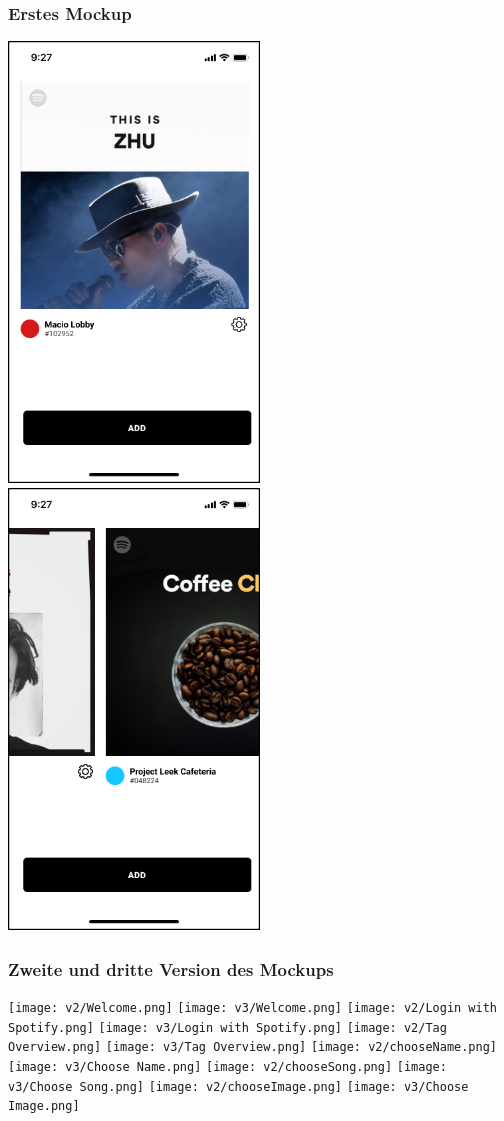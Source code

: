 \documentclass[10pt, a4paper]{article}
\begin{document}
  \subsubsection*{Erstes Mockup}
  \includegraphics[width=0.5\textwidth]{v1/Home.png}
  \includegraphics[width=0.5\textwidth]{v1/Carousel.png}
  \newpage
  \subsubsection*{Zweite und dritte Version des Mockups}
  \texttt{[image: v2/Welcome.png]}
  \texttt{[image: v3/Welcome.png]}
  \newpage
  \texttt{[image: v2/Login with Spotify.png]}
  \texttt{[image: v3/Login with Spotify.png]}
  \newpage
  \texttt{[image: v2/Tag Overview.png]}
  \texttt{[image: v3/Tag Overview.png]}
  \newpage
  \texttt{[image: v2/chooseName.png]}
  \texttt{[image: v3/Choose Name.png]}
  \newpage
  \texttt{[image: v2/chooseSong.png]}
  \texttt{[image: v3/Choose Song.png]}
  \newpage
  \texttt{[image: v2/chooseImage.png]}
  \texttt{[image: v3/Choose Image.png]}
\end{document}
